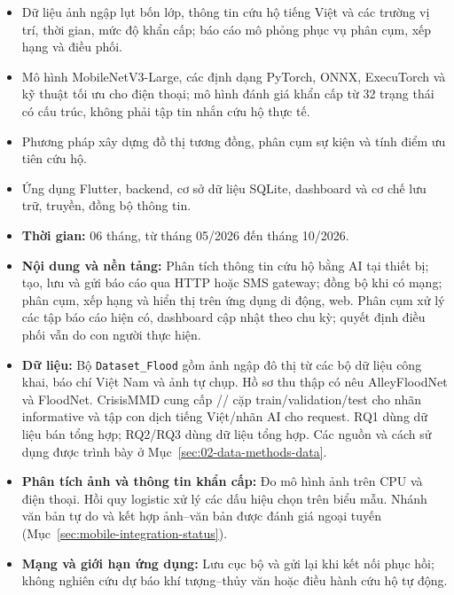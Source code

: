 
\begin{itemize}
    \item Dữ liệu ảnh ngập lụt bốn lớp, thông tin cứu hộ tiếng Việt và các trường vị trí, thời gian, mức độ khẩn cấp; báo cáo mô phỏng phục vụ phân cụm, xếp hạng và điều phối.
    \item Mô hình MobileNetV3-Large, các định dạng PyTorch, ONNX, ExecuTorch và kỹ thuật tối ưu cho điện thoại; mô hình đánh giá khẩn cấp từ 32 trạng thái có cấu trúc, không phải tập tin nhắn cứu hộ thực tế.
    \item Phương pháp xây dựng đồ thị tương đồng, phân cụm sự kiện và tính điểm ưu tiên cứu hộ.
    \item Ứng dụng Flutter, backend, cơ sở dữ liệu SQLite, dashboard và cơ chế lưu trữ, truyền, đồng bộ thông tin.
\end{itemize}


\begin{itemize}
    \item \textbf{Thời gian:} 06 tháng, từ tháng 05/2026 đến tháng 10/2026.
    \item \textbf{Nội dung và nền tảng:} Phân tích thông tin cứu hộ bằng AI tại thiết bị; tạo, lưu và gửi báo cáo qua HTTP hoặc SMS gateway; đồng bộ khi có mạng; phân cụm, xếp hạng và hiển thị trên ứng dụng di động, web. Phân cụm xử lý các tập báo cáo hiện có, dashboard cập nhật theo chu kỳ; quyết định điều phối vẫn do con người thực hiện.
    \item \textbf{Dữ liệu:} Bộ \texttt{Dataset\_Flood} gồm ảnh ngập đô thị từ các bộ dữ liệu công khai, báo chí Việt Nam và ảnh tự chụp. Hồ sơ thu thập có nêu AlleyFloodNet và FloodNet. CrisisMMD cung cấp \MMTrainN/\MMDevN/\MMTestN{} cặp train/validation/test cho nhãn informative và tập con dịch tiếng Việt/nhãn AI cho request. RQ1 dùng dữ liệu bán tổng hợp; RQ2/RQ3 dùng dữ liệu tổng hợp. Các nguồn và cách sử dụng được trình bày ở Mục~\ref{sec:02-data-methods-data}.
    \item \textbf{Phân tích ảnh và thông tin khẩn cấp:} Đo mô hình ảnh trên CPU và điện thoại. Hồi quy logistic xử lý các dấu hiệu chọn trên biểu mẫu. Nhánh văn bản tự do và kết hợp ảnh--văn bản được đánh giá ngoại tuyến (Mục~\ref{sec:mobile-integration-status}).
    \item \textbf{Mạng và giới hạn ứng dụng:} Lưu cục bộ và gửi lại khi kết nối phục hồi; không nghiên cứu dự báo khí tượng--thủy văn hoặc điều hành cứu hộ tự động.
\end{itemize}
